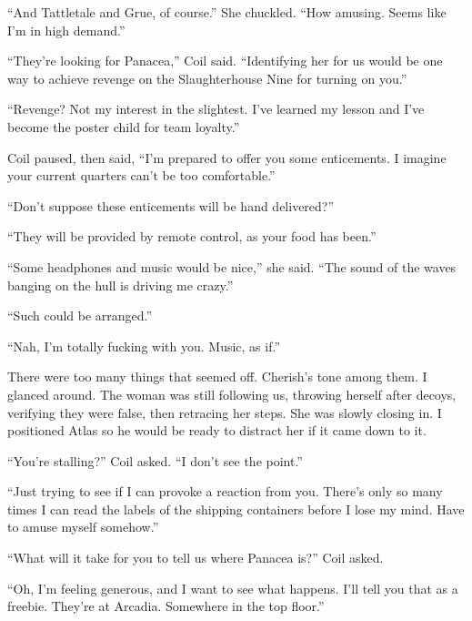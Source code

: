 ``And Tattletale and Grue, of course.''  She chuckled.  ``How amusing.  Seems like I'm in high demand.''



``They're looking for Panacea,'' Coil said.  ``Identifying her for us would be one way to achieve revenge on the Slaughterhouse Nine for turning on you.''



``Revenge?  Not my interest in the slightest.  I've learned my lesson and I've become the poster child for team loyalty.''



Coil paused, then said, ``I'm prepared to offer you some enticements.  I imagine your current quarters can't be too comfortable.''



``Don't suppose these enticements will be hand delivered?''



``They will be provided by remote control, as your food has been.''



``Some headphones and music would be nice,'' she said.  ``The sound of the waves banging on the hull is driving me crazy.''



``Such could be arranged.''



``Nah, I'm totally fucking with you.  Music, as if.''



There were too many things that seemed off.  Cherish's tone among them.  I glanced around.  The woman was still following us, throwing herself after decoys, verifying they were false, then retracing her steps.  She was slowly closing in.  I positioned Atlas so he would be ready to distract her if it came down to it.



``You're stalling?''  Coil asked.  ``I don't see the point.''



``Just trying to see if I can provoke a reaction from you.  There's only so many times I can read the labels of the shipping containers before I lose my mind.  Have to amuse myself somehow.''



``What will it take for you to tell us where Panacea is?''  Coil asked.



``Oh, I'm feeling generous, and I want to see what happens.  I'll tell you that as a freebie.  They're at Arcadia.  Somewhere in the top floor.''



